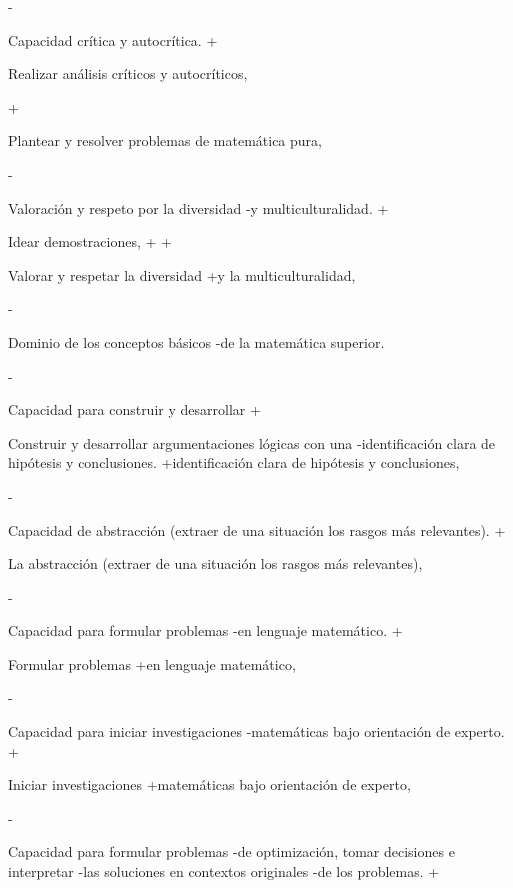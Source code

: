 \begin{description}
\begin{enumerate}
 
 
-\item {Capacidad crítica y autocrítica.} 
+\item {Realizar análisis  críticos y autocríticos,} 
  
+\item {Plantear y resolver problemas de matemática pura,} 
 
-\item {Valoración y respeto por la diversidad
-y multiculturalidad.} 
+\item{Idear demostraciones,}
+
+\item {Valorar y respetar  la diversidad
+y la multiculturalidad,} 
  
 
 
 
 
-\item {Dominio de los conceptos básicos
-de la matemática superior.} 
  
 
-\item {Capacidad para construir y desarrollar
+\item {Construir y desarrollar
 argumentaciones lógicas con una
-identificación clara de hipótesis y conclusiones.} 
+identificación clara de hipótesis y conclusiones,} 
  
-\item {Capacidad de abstracción (extraer de una situación los rasgos más relevantes).} 
+\item {La abstracción (extraer de una situación los rasgos más relevantes),} 
  
 
 
-\item {Capacidad para formular problemas
-en lenguaje matemático.} 
+\item {Formular problemas
+en lenguaje matemático,} 
  
 
   
 
 
-\item {Capacidad para iniciar investigaciones
-matemáticas bajo orientación de experto.} 
+\item {Iniciar investigaciones
+matemáticas bajo orientación de experto,} 
  
 
 
-\item {Capacidad para formular problemas
-de optimización, tomar decisiones e interpretar
-las soluciones en contextos originales
-de los problemas.} 
+ 
  
 
 

\end{enumerate}
\end{description}
